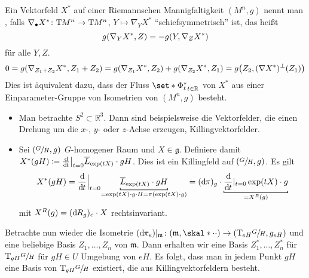\begin{erinnerung}[{name=[Killingvektorfeld]}]
	Ein Vektorfeld $X^*$ auf einer Riemannschen Mannigfaltigkeit $(M^n,g)$ nennt man , falls $\nabla_\bullet X^* \colon \Tmap M^n \to \Tmap M^n$, $Y \mapsto \nabla_Y X^*$ \enquote{schiefsymmetrisch} ist, das heißt
	\[
		g \enbrace*{\nabla_Y X^*,Z} = - g \enbrace*{Y,\nabla_Z X^*}
	\]
	für alle $Y,Z$.
	\[
		0 = g \enbrace*{\nabla_{Z_1 + Z_2}X^*,Z_1 + Z_2} = g \enbrace*{\nabla_{Z_1} X^*,Z_2} + g \enbrace*{\nabla_{Z_2} X^*, Z_1} = g \enbrace*{Z_2, (\nabla X^*)^\perp (Z_1)}
	\]
	Dies ist äquivalent dazu, dass der Fluss $\set*{\Phi_t^*}_{t \in \mathbb{R}}$ von $X^*$ aus einer Einparameter-Gruppe von Isometrien von $(M^n,g)$ besteht.
\end{erinnerung}

\begin{beispiel*}[{name=[Killingvektorfelder]}]
	\begin{itemize}
		\item Man betrachte $S^2 \subset \mathbb{R}^3$.
		Dann sind beispielsweise die Vektorfelder, die einen Drehung um die $x$-, $y$- oder $z$-Achse erzeugen, Killingvektorfelder.
		\item Sei $\enbrace*{\sfrac{G}{H},g}$ $G$-homogener Raum und $X \in \mathfrak{g}$. 
		Definiere damit $X^*(g H) \coloneqq \diffd{}{t}\big|_{t=0} \overline{L}_{\exp(tX)} \cdot gH$.
		Dies ist ein Killingfeld auf $(\sfrac{G}{H},g)$.
		Es gilt 
		\[
			X^*(gH) = \diffd{}{t}\Big|_{t=0} \Underbracket{\overline{L}_{\exp(tX)} \cdot gH}{= \exp(t X) \cdot g \cdot H = \pi \enbrace*{\exp(tX) \cdot g}} = (\mathd \pi)_g \cdot \Underbracket{\diffd{}{t}|_{t=0} \exp(tX) \cdot g }{= X^R(g)}
		\]
		mit $X^R(g) = (\mathd R_g)_e \cdot X$ rechtsinvariant.
	\end{itemize}
\end{beispiel*}

Betrachte nun wieder die Isometrie $(\mathd \pi_e)|_\mathfrak{m} \colon (\mathfrak{m},\skal*{\cdot }{\cdot }) \to \enbrace*{\Tmap_{eH} \sfrac{G}{H},g_{eH}}$ und eine beliebige Basis $Z_1, \ldots ,Z_n$ von $\mathfrak{m}$.
Dann erhalten wir eine Basis $Z_1^*, \ldots , Z_n^*$ für $\Tmap_{gH} \sfrac{G}{H}$ für $gH \in U$ Umgebung von $eH$.
Es folgt, dass man in jedem Punkt $g H$ eine Basis  von $\Tmap_{gH} \sfrac{G}{H}$ existiert, die aus Killingvektorfeldern besteht.

